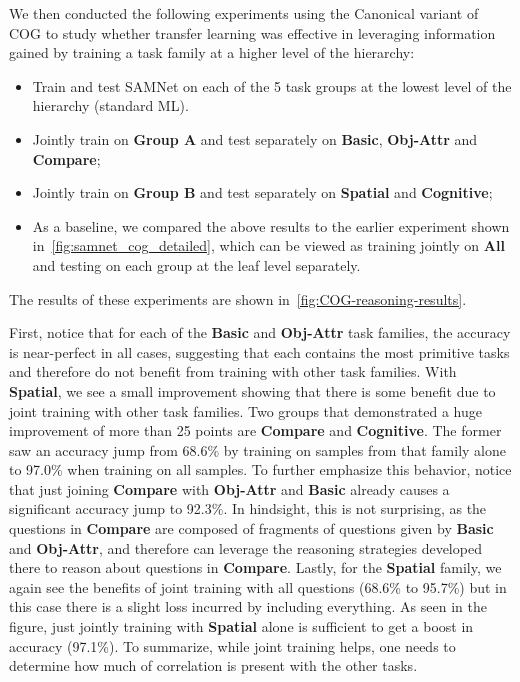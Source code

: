 We then conducted the following experiments using the Canonical variant of COG to study 
whether transfer learning was effective in leveraging information gained by training a task family at a higher level
of the hierarchy:
 \begin{itemize}
 	\compresslist
	\item Train and test SAMNet on each of the 5 task groups at the lowest level of the hierarchy (standard ML). 
	\item Jointly train on \textbf{Group A} and test separately on \textbf{Basic}, \textbf{Obj-Attr} and \textbf{Compare};
	\item Jointly train on \textbf{Group B} and test separately on \textbf{Spatial} and \textbf{Cognitive};
	\item As a baseline, we compared the above results to the earlier experiment shown in~\cref{fig:samnet_cog_detailed}, which
	can be viewed as training jointly on \textbf{All} and testing on each group at the leaf level separately.
\end{itemize}

The results of these experiments are shown in~\cref{fig:COG-reasoning-results}.

First, notice that for each of the \textbf{Basic} and \textbf{Obj-Attr} task families, the accuracy is near-perfect in all cases, suggesting that each contains the most primitive tasks and therefore do not benefit from training with other task families.
With \textbf{Spatial}, we see a small improvement showing that there is some benefit due to joint training with other task families.
Two groups that demonstrated a huge improvement of more than 25 points are \textbf{Compare} and \textbf{Cognitive}.
The former saw an accuracy jump from 68.6\% by training on samples from that family alone
to 97.0\% when training on all samples. To further emphasize this behavior, notice that 
just joining \textbf{Compare} with \textbf{Obj-Attr} and \textbf{Basic} already causes a significant accuracy jump to 92.3\%. 
In hindsight, this is not surprising, as the questions in \textbf{Compare} are composed
of fragments of questions given by \textbf{Basic} and \textbf{Obj-Attr}, and therefore can leverage the reasoning strategies developed there to reason about questions in \textbf{Compare}.
Lastly, for the \textbf{Spatial} family, we again see the benefits of joint training with all questions (68.6\% to 95.7\%) but in this case there
is a slight loss incurred by including everything. As seen in the figure, just jointly training with \textbf{Spatial} alone is sufficient to get a boost in accuracy (97.1\%). To summarize, while joint training helps, one needs to determine how much of correlation is present with the other tasks.


